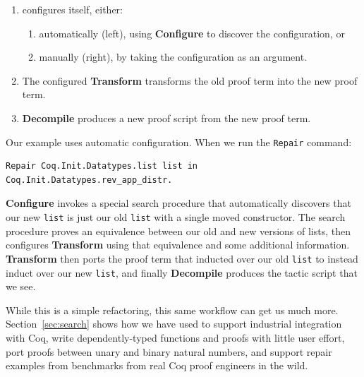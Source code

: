 \begin{enumerate}
\item \toolname configures itself, either:
\begin{enumerate}
\item automatically (left), using \textbf{Configure} to discover the configuration, or
\item manually (right), by taking the configuration as an argument.
\end{enumerate}
\item The configured \textbf{Transform} transforms the old proof term into the new proof term.
\item \textbf{Decompile} produces a new proof script from the new proof term.
\end{enumerate}

Our example uses automatic configuration. When we run the \lstinline{Repair} command:

\begin{lstlisting}
Repair Coq.Init.Datatypes.list list in Coq.Init.Datatypes.rev_app_distr.
\end{lstlisting}
\textbf{Configure} invokes a special search procedure that automatically discovers that our new \lstinline{list}
is just our old \lstinline{list} with a single moved constructor.
The search procedure proves an equivalence between our old and new versions of lists,
then configures \textbf{Transform} using that equivalence and some additional information.
\textbf{Transform} then ports the proof term that inducted over our old \lstinline{list}
to instead induct over our new \lstinline{list}, and finally
\textbf{Decompile} produces the tactic script that we see.

While this is a simple refactoring, this same workflow can get us much more.
Section~\ref{sec:search} shows how we have used \toolname to support industrial integration with Coq,
write dependently-typed functions and proofs with little user effort,
port proofs between unary and binary natural numbers,
and support repair examples from benchmarks from real Coq proof engineers in the wild.


